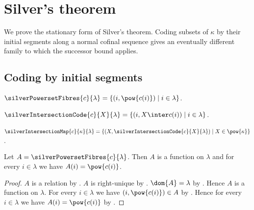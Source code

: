 \section{Silver's theorem}





We prove the stationary form of Silver's theorem. Coding subsets of
$\kappa$ by their initial segments along a normal cofinal sequence gives
an eventually different family to which the successor bound applies.

\subsection{Coding by initial segments}

\begin{definition}\label{silver_powerset_fibres}
    $\silverPowersetFibres{c}{\lambda}
        =\{(i,\pow{c(i)})\mid i\in\lambda\}$.
\end{definition}

\begin{definition}\label{silver_intersection_code}
    $\silverIntersectionCode{c}{X}{\lambda}
        =\{(i,X\inter c(i))\mid i\in\lambda\}$.
\end{definition}

\begin{definition}\label{silver_intersection_map}
    $\silverIntersectionMap{c}{\kappa}{\lambda}
        =\{(X,\silverIntersectionCode{c}{X}{\lambda})
            \mid X\in\pow{\kappa}\}$.
\end{definition}

\begin{proposition}\label{silver_powerset_fibres_type}
    Let $A=\silverPowersetFibres{c}{\lambda}$.
    Then $A$ is a function on $\lambda$ and
        for every $i\in\lambda$ we have $A(i)=\pow{c(i)}$.
\end{proposition}
\begin{proof}
    $A$ is a relation by .
    $A$ is right-unique
        by .
    $\dom{A}=\lambda$
        by .
    Hence $A$ is a function on $\lambda$.
    For every $i\in\lambda$ we have $(i,\pow{c(i)})\in A$
        by .
    Hence for every $i\in\lambda$ we have $A(i)=\pow{c(i)}$
        by .
\end{proof}

